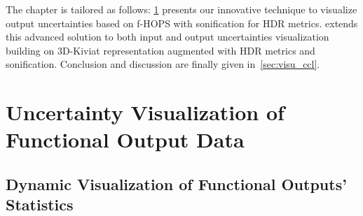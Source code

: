 The chapter is tailored as follows: \cref{sec:uqvisu} presents our innovative technique to visualize output uncertainties based on f-HOPS with sonification for HDR metrics.  extends this advanced solution to both input and output uncertainties visualization building on 3D-Kiviat representation augmented with HDR metrics and sonification. Conclusion and discussion are finally given in~\cref{sec:visu_ccl}.


\section{Uncertainty Visualization of Functional Output Data}
\label{sec:uqvisu}

\subsection{Dynamic Visualization of Functional Outputs' Statistics}
\label{subsec:fhop}

%



